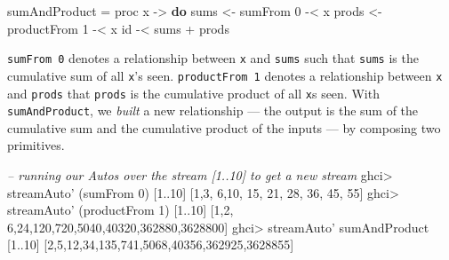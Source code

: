 \documentclass[]{article}
\newenvironment{Shaded}{\begin{snugshade}}{\end{snugshade}}
\newcommand{\CommentTok}[1]{\textcolor[rgb]{0.56,0.35,0.01}{\textit{#1}}}
\newcommand{\DecValTok}[1]{\textcolor[rgb]{0.00,0.00,0.81}{#1}}
\newcommand{\FunctionTok}[1]{\textcolor[rgb]{0.00,0.00,0.00}{#1}}
\newcommand{\KeywordTok}[1]{\textcolor[rgb]{0.13,0.29,0.53}{\textbf{#1}}}
\newcommand{\NormalTok}[1]{#1}
\newcommand{\OtherTok}[1]{\textcolor[rgb]{0.56,0.35,0.01}{#1}}
\begin{document}
\begin{Shaded}
\begin{Highlighting}[]
\NormalTok{sumAndProduct }\FunctionTok{=}\NormalTok{ proc x }\OtherTok{->} \KeywordTok{do}
\NormalTok{    sums  }\OtherTok{<-}\NormalTok{ sumFrom }\DecValTok{0}     \FunctionTok{-<}\NormalTok{ x}
\NormalTok{    prods }\OtherTok{<-}\NormalTok{ productFrom }\DecValTok{1} \FunctionTok{-<}\NormalTok{ x}
\NormalTok{    id }\FunctionTok{-<}\NormalTok{ sums }\FunctionTok{+}\NormalTok{ prods}
\end{Highlighting}
\end{Shaded}

\texttt{sumFrom\ 0} denotes a relationship between \texttt{x} and \texttt{sums}
such that \texttt{sums} is the cumulative sum of all \texttt{x}'s seen.
\texttt{productFrom\ 1} denotes a relationship between \texttt{x} and
\texttt{prods} that \texttt{prods} is the cumulative product of all \texttt{x}s
seen. With \texttt{sumAndProduct}, we \emph{built} a new relationship --- the
output is the sum of the cumulative sum and the cumulative product of the inputs
--- by composing two primitives.

\begin{Shaded}
\begin{Highlighting}[]
\CommentTok{-- running our Autos over the stream [1..10] to get a new stream}
\NormalTok{ghci}\FunctionTok{>}\NormalTok{ streamAuto' (sumFrom }\DecValTok{0}\NormalTok{) [}\DecValTok{1}\FunctionTok{..}\DecValTok{10}\NormalTok{]}
\NormalTok{[}\DecValTok{1}\NormalTok{,}\DecValTok{3}\NormalTok{, }\DecValTok{6}\NormalTok{,}\DecValTok{10}\NormalTok{, }\DecValTok{15}\NormalTok{, }\DecValTok{21}\NormalTok{,  }\DecValTok{28}\NormalTok{,   }\DecValTok{36}\NormalTok{,    }\DecValTok{45}\NormalTok{,     }\DecValTok{55}\NormalTok{]}
\NormalTok{ghci}\FunctionTok{>}\NormalTok{ streamAuto' (productFrom }\DecValTok{1}\NormalTok{) [}\DecValTok{1}\FunctionTok{..}\DecValTok{10}\NormalTok{]}
\NormalTok{[}\DecValTok{1}\NormalTok{,}\DecValTok{2}\NormalTok{, }\DecValTok{6}\NormalTok{,}\DecValTok{24}\NormalTok{,}\DecValTok{120}\NormalTok{,}\DecValTok{720}\NormalTok{,}\DecValTok{5040}\NormalTok{,}\DecValTok{40320}\NormalTok{,}\DecValTok{362880}\NormalTok{,}\DecValTok{3628800}\NormalTok{]}
\NormalTok{ghci}\FunctionTok{>}\NormalTok{ streamAuto' sumAndProduct [}\DecValTok{1}\FunctionTok{..}\DecValTok{10}\NormalTok{]}
\NormalTok{[}\DecValTok{2}\NormalTok{,}\DecValTok{5}\NormalTok{,}\DecValTok{12}\NormalTok{,}\DecValTok{34}\NormalTok{,}\DecValTok{135}\NormalTok{,}\DecValTok{741}\NormalTok{,}\DecValTok{5068}\NormalTok{,}\DecValTok{40356}\NormalTok{,}\DecValTok{362925}\NormalTok{,}\DecValTok{3628855}\NormalTok{]}
\end{Highlighting}
\end{Shaded}
\end{document}
